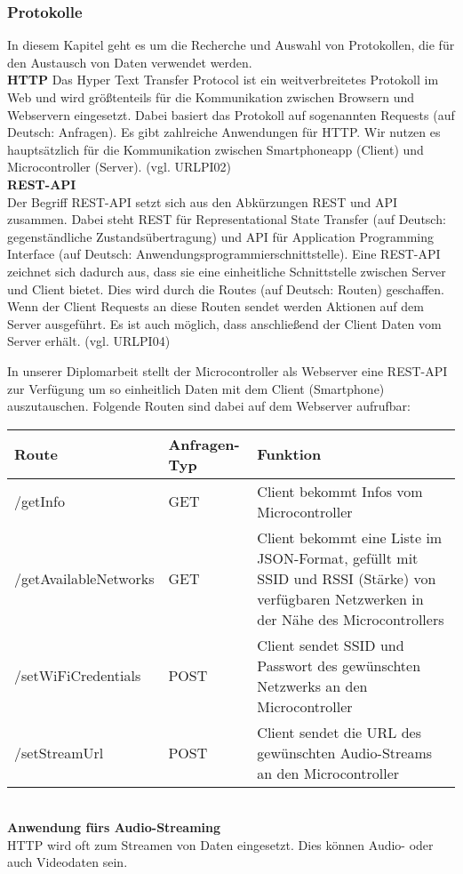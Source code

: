 \documentclass[]{article}
\begin{document}
\subsubsection{Protokolle}
In diesem Kapitel geht es um die Recherche und Auswahl von Protokollen, die für den Austausch von Daten verwendet werden.
\newline \\
\textbf{HTTP}
\newline
Das Hyper Text Transfer Protocol ist ein weitverbreitetes Protokoll im Web und wird größtenteils für die Kommunikation zwischen Browsern und Webservern eingesetzt. Dabei basiert das Protokoll auf sogenannten \glqq Requests\grqq{} (auf Deutsch: Anfragen). Es gibt zahlreiche Anwendungen für HTTP. Wir nutzen es hauptsätzlich für die Kommunikation zwischen Smartphoneapp (Client) und Microcontroller (Server). (vgl. URLPI02) \newline \\
\textbf{REST-API} \\ 
Der Begriff \glqq REST-API\grqq{} setzt sich aus den Abkürzungen \glqq REST\grqq{} und \glqq API\grqq{} zusammen. Dabei steht \glqq REST\grqq{} für \glqq Representational State Transfer\grqq{} (auf Deutsch: \glqq gegenständliche Zustandsübertragung\grqq{}) und \glqq API\grqq{} für \glqq Application Programming Interface\grqq{} (auf Deutsch: \glqq Anwendungsprogrammierschnittstelle\grqq{}). Eine REST-API zeichnet sich dadurch aus, dass sie eine einheitliche Schnittstelle zwischen Server und Client bietet. Dies wird durch die \glqq Routes\grqq{} (auf Deutsch: \glqq Routen\grqq{}) geschaffen. Wenn der Client Requests an diese Routen sendet werden Aktionen auf dem Server ausgeführt. Es ist auch möglich, dass anschließend der Client Daten vom Server erhält. (vgl. URLPI04)

In unserer Diplomarbeit stellt der Microcontroller als Webserver eine REST-API zur Verfügung um so einheitlich Daten mit dem Client (Smartphone) auszutauschen.
Folgende Routen sind dabei auf dem Webserver aufrufbar: \newline

\begin{tabularx}{\textwidth}{|l|l|X|}
\hline
\textbf{Route} & \textbf{Anfragen-Typ} & \textbf{Funktion} \\
\hline
/getInfo & GET & Client bekommt Infos vom Microcontroller \\
\hline 
/getAvailableNetworks & GET & Client bekommt eine Liste im JSON-Format, gefüllt mit SSID und RSSI (Stärke) von verfügbaren Netzwerken in der Nähe des Microcontrollers \\
\hline
/setWiFiCredentials & POST & Client sendet SSID und Passwort des gewünschten Netzwerks an den Microcontroller \\
\hline
/setStreamUrl & POST & Client sendet die URL des gewünschten Audio-Streams an den Microcontroller \\
\hline
\end{tabularx} \newline \\
\textbf{Anwendung fürs Audio-Streaming} \\
HTTP wird oft zum Streamen von Daten eingesetzt. Dies können Audio- oder auch Videodaten sein.
\end{document}
